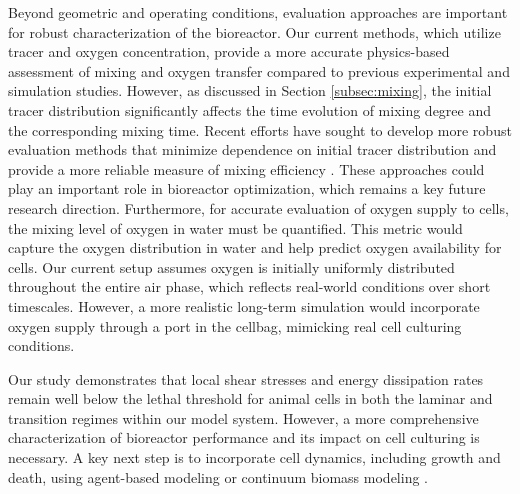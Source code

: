 \documentclass[final,3p,times,twocolumn,authoryear]{elsarticle}
\theoremstyle{definition}
\begin{document}
Beyond geometric and operating conditions, evaluation approaches are important for robust characterization of the bioreactor. Our current methods, which utilize tracer and oxygen concentration, provide a more accurate physics-based assessment of mixing and oxygen transfer compared to previous experimental \citep{Singh1999,Bai2019a,Bartczak2022} and simulation \citep{Svay2020,Seidel2022} studies. However, as discussed in Section \ref{subsec:mixing}, the initial tracer distribution significantly affects the time evolution of mixing degree and the corresponding mixing time. Recent efforts have sought to develop more robust evaluation methods that minimize dependence on initial tracer distribution and provide a more reliable measure of mixing efficiency \citep{Gubanov2009,Gleeson2005,Farazmand2017,Shi2024}. These approaches could play an important role in bioreactor optimization, which remains a key future research direction. Furthermore, for accurate evaluation of oxygen supply to cells, the mixing level of oxygen in water must be quantified. This metric would capture the oxygen distribution in water and help predict oxygen availability for cells. Our current setup assumes oxygen is initially uniformly distributed throughout the entire air phase, which reflects real-world conditions over short timescales. However, a more realistic long-term simulation would incorporate oxygen supply through a port in the cellbag, mimicking real cell culturing conditions. 

Our study demonstrates that local shear stresses and energy dissipation rates remain well below the lethal threshold for animal cells in both the laminar and transition regimes within our model system. However, a more comprehensive characterization of bioreactor performance and its impact on cell culturing is necessary. A key next step is to incorporate cell dynamics, including growth and death, using agent-based modeling \citep{Cantarero2024} or continuum biomass modeling \citep{Chao2015}. 
\end{document}

